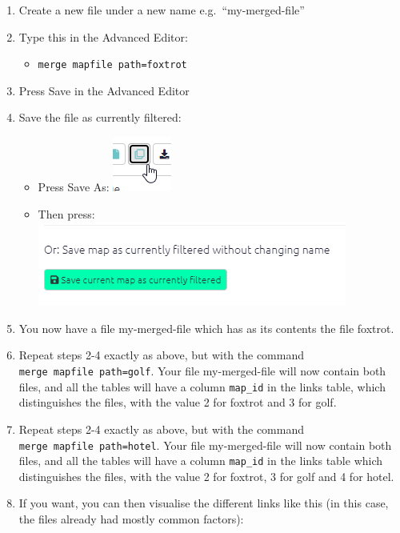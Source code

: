 \documentclass[
]{book}
\providecommand{\tightlist}{%
  \setlength{\itemsep}{0pt}\setlength{\parskip}{0pt}}
\begin{document}
\begin{enumerate}
\def\labelenumi{\arabic{enumi}.}
\item
  Create a new file under a new name e.g.~``my-merged-file''
\item
  Type this in the Advanced Editor:

  \begin{itemize}
  \tightlist
  \item
    \texttt{merge\ mapfile\ path=foxtrot}
  \end{itemize}
\item
  Press Save in the Advanced Editor
\item
  Save the file as currently filtered:

  \begin{itemize}
  \tightlist
  \item
    Press Save As: \includegraphics{_assets/image-20220126194223383.png}
  \item
    Then press: \includegraphics{_assets/image-20220126194329472.png}
  \end{itemize}
\item
  You now have a file my-merged-file which has as its contents the file foxtrot.
\item
  Repeat steps 2-4 exactly as above, but with the command \texttt{merge\ mapfile\ path=golf}. Your file my-merged-file will now contain both files, and all the tables will have a column \texttt{map\_id} in the links table, which distinguishes the files, with the value 2 for foxtrot and 3 for golf.
\item
  Repeat steps 2-4 exactly as above, but with the command \texttt{merge\ mapfile\ path=hotel}. Your file my-merged-file will now contain both files, and all the tables will have a column \texttt{map\_id} in the links table which distinguishes the files, with the value 2 for foxtrot, 3 for golf and 4 for hotel.
\item
  If you want, you can then visualise the different links like this (in this case, the files already had mostly common factors):


\end{enumerate}
\end{document}
